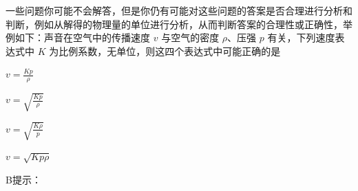 一些问题你可能不会解答，但是你仍有可能对这些问题的答案是否合理进行分析和判断，例如从解得的物理量的单位进行分析，从而判断答案的合理性或正确性，举例如下：声音在空气中的传播速度 \(v\) 与空气的密度 \(\rho\)、压强 \(p\) 有关，下列速度表达式中 \(K\) 为比例系数，无单位，则这四个表达式中可能正确的是\paren[]
\begin{choices}
	\item \(v = \frac{K p}{\rho}\)
	\item \(v = \sqrt{\frac{K p}{\rho}}\)
	\item \(v = \sqrt{\frac{K \rho}{p}}\)
	\item \(v = \sqrt{K p \rho}\)
\end{choices}
\begin{answer}
    B\qquad 提示：
\end{answer}